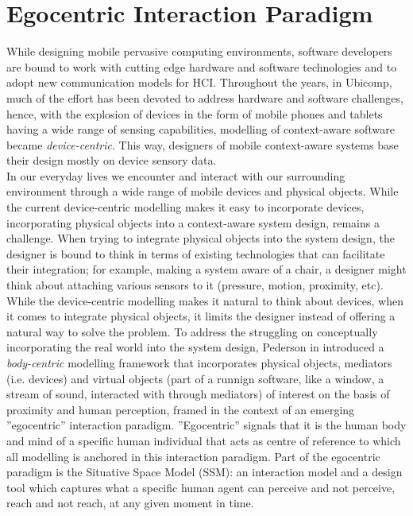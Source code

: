 \section{Egocentric Interaction Paradigm}
While designing mobile pervasive computing environments, software developers are bound to work with cutting edge hardware and software technologies and to adopt new communication models for HCI. Throughout the years, in Ubicomp, much of the effort has been devoted to address hardware and software challenges, hence, with the explosion of devices in the form of mobile phones and tablets having a wide range of sensing capabilities, modelling of context-aware software became \emph{device-centric}. This way, designers of mobile context-aware systems base their design mostly on device sensory data.\\

In our everyday lives we encounter and interact with our surrounding environment through a wide range of mobile devices and physical objects. While the current device-centric modelling makes it easy to incorporate devices, incorporating physical objects into a context-aware system design, remains a challenge. When trying to integrate physical objects into the system design, the designer is bound to think in terms of existing technologies that can facilitate their integration; for example, making a system aware of a chair, a designer might think about attaching various sensors to it (pressure, motion, proximity, etc). While the device-centric modelling makes it natural to think about devices, when it comes to integrate physical objects, it limits the designer instead of offering a natural way to solve the problem. To address the struggling on conceptually incorporating the real world into the system design, Pederson in \cite{pederson2010towards} introduced a \emph{body-centric} modelling framework that incorporates physical objects, mediators (i.e. devices) and virtual objects (part of a runnign software, like a window, a stream of sound, interacted with through mediators) of interest on the basis of proximity and human perception, framed in the context of an emerging ''egocentric'' interaction paradigm. ''Egocentric'' signals that it is the human body and mind of a specific human individual that acts as centre of reference to which all modelling is anchored in this interaction paradigm. Part of the egocentric paradigm is the Situative Space Model (SSM): an interaction model and a design tool which captures what a specific human agent can perceive and not perceive, reach and not reach, at any given moment in time.\\

